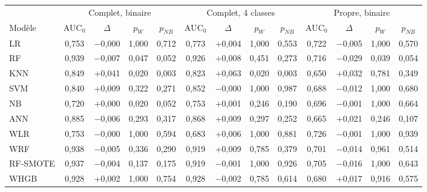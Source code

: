 \begin{tabular}{lcccccccccccc}
\toprule
& \multicolumn{4}{c}{Complet, binaire} & \multicolumn{4}{c}{Complet, 4 classes} & \multicolumn{4}{c}{Propre, binaire} \\\cmidrule(lr){2-5}\cmidrule(lr){6-9}\cmidrule(lr){10-13}
Modèle & AUC$_0$ & $\Delta$ & $p_W$ & $p_{NB}$ & AUC$_0$ & $\Delta$ & $p_W$ & $p_{NB}$ & AUC$_0$ & $\Delta$ & $p_W$ & $p_{NB}$ \\
\midrule
LR & 0,753 & $-$0,000 & 1,000 & 0,712 & 0,773 & +0,004 & 1,000 & 0,553 & 0,722 & $-$0,005 & 1,000 & 0,570 \\
RF & 0,939 & $-$0,007 & 0,047 & 0,052 & 0,926 & +0,008 & 0,451 & 0,273 & 0,716 & $-$0,029 & 0,039 & 0,054 \\
KNN & 0,849 & +0,041 & 0,020 & 0,003 & 0,823 & +0,063 & 0,020 & 0,003 & 0,650 & +0,032 & 0,781 & 0,349 \\
SVM & 0,840 & +0,009 & 0,322 & 0,271 & 0,852 & $-$0,000 & 1,000 & 0,987 & 0,688 & $-$0,012 & 1,000 & 0,680 \\
NB & 0,720 & +0,000 & 0,020 & 0,052 & 0,753 & +0,001 & 0,246 & 0,190 & 0,696 & $-$0,001 & 1,000 & 0,664 \\
ANN & 0,885 & $-$0,006 & 0,293 & 0,317 & 0,868 & +0,009 & 0,297 & 0,252 & 0,665 & +0,021 & 0,246 & 0,107 \\
\midrule
WLR & 0,753 & $-$0,000 & 1,000 & 0,594 & 0,683 & +0,006 & 1,000 & 0,881 & 0,726 & $-$0,001 & 1,000 & 0,939 \\
WRF & 0,938 & $-$0,005 & 0,336 & 0,290 & 0,919 & +0,009 & 0,785 & 0,379 & 0,701 & $-$0,014 & 0,961 & 0,514 \\
RF-SMOTE & 0,937 & $-$0,004 & 0,137 & 0,175 & 0,919 & $-$0,001 & 1,000 & 0,926 & 0,705 & $-$0,016 & 1,000 & 0,643 \\
WHGB & 0,928 & +0,002 & 1,000 & 0,754 & 0,928 & $-$0,002 & 0,785 & 0,614 & 0,680 & +0,017 & 0,916 & 0,575 \\
\bottomrule
\end{tabular}